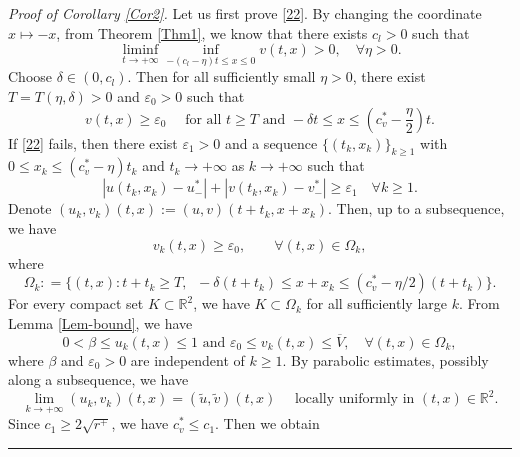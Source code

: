 \documentclass[10pt]{article}
\numberwithin{equation}{section}
\newcommand{\R}{\mathbb{R}}
\newenvironment{proof}[1][Proof]{\noindent\textit{#1.} }{\hfill \rule{0.5em}{0.5em}}
\begin{document}
\begin{proof}[Proof of Corollary \ref{Cor2}]
Let us first prove \eqref{22}.   By changing the coordinate $x\mapsto -x$, from Theorem \ref{Thm1}, we know that there exists $c_l>0$ such that
\begin{equation*}
\liminf_{t\to +\infty} \inf_{ -(c_l-\eta) t   \leq   x \leq  0 }  v(t,x) >0,  \quad \forall \eta >0.
\end{equation*}
Choose $\delta\in (0, c_l)$. Then for all sufficiently  small  $\eta>0$, there exist   $T=T(\eta, \delta) >0$  and $\varepsilon_0>0$ such that 
\begin{equation*}
v(t,x) \geq \varepsilon_0     \quad \text{ for all } t\geq T   \text{ and }    - \delta t  \leq x\leq (c_v^* - \frac{\eta}{2}) t.
\end{equation*}
If  \eqref{22} fails,   then  there exist  $\varepsilon_1>0$  and  a sequence $\{( t_k, x_k)\}_{k \geq 1} $ with 
$0 \leq x_k   \leq ( c_v^*- \eta) t_k$ and $t_k \to +\infty$ as $k \to +\infty$ such that 
\begin{equation}\label{contr-uv}
 \left| u(t_k, x_k)-u^*_{-}  \right| + \left| v(t_k, x_k) - v^*_{-}\right|   \geq \varepsilon_1   \quad \forall k\geq 1.
\end{equation}
 Denote $(u_k, v_k) (t,x) := (u, v) (t+t_k, x+x_k)$. 
 Then, up to a subsequence,  we have 
 \begin{equation*}
 v_k(t, x)\geq \varepsilon_0,   \qquad      \forall (t,x )\in  \Omega_k,
 \end{equation*}
 where 
 \begin{equation*}
 \Omega_k: = \{  (t,x): t+t_k \geq T,  \;\; - \delta (t+ t_k)  \leq  x+x_k\leq (c_v^* - \eta/2) (t+t_k)  \}.
 \end{equation*}
 For every compact set \(K\subset\mathbb R^2\), we have \(K\subset\Omega_k\) for all sufficiently large \(k\).
From  Lemma \ref{Lem-bound}, we have 
\begin{equation}\label{uvbbb}
 0<\beta \leq  u_k(t,x) \leq 1   \text{ and }    \varepsilon_0  \leq   v_k(t,x) \leq \overline{V},    \quad \forall (t,x) \in \Omega_k,  
\end{equation}
where $\beta$ and $\varepsilon_0>0$ are independent of $k \geq 1$.
 By  parabolic estimates,   possibly along a subsequence,  we have 
  \begin{equation*}
  \lim_{k\to +\infty} (u_k, v_k)(t,x) = (\tilde{u}, \tilde{v})(t,x) \quad \text{ locally uniformly in }  (t,x) \in \R^2. 
  \end{equation*}
  Since $c_1\geq  2\sqrt{r^+}$,  we have $c_v^* \leq c_1$. Then we  obtain

\end{proof}
\end{document}

